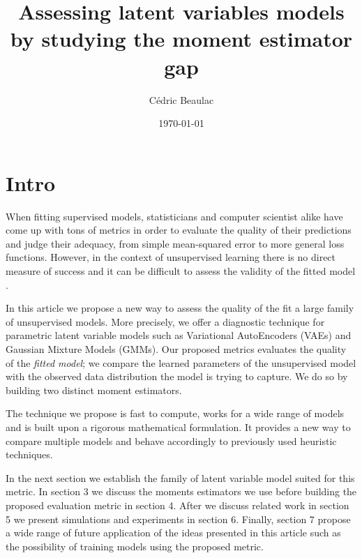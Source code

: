 \documentclass{article}
\begin{document}
\title{Assessing latent variables models by studying the moment estimator gap}



\author{C\'edric Beaulac}


\date{\today}

\maketitle


\section{Intro}

When fitting supervised models, statisticians and computer scientist alike have come up with tons of metrics in order to evaluate the quality of their predictions and judge their adequacy, from simple mean-squared error to more general loss functions. However, in the context of unsupervised learning there is no direct measure of success and it can be difficult to assess the validity of the fitted model \cite{Hastie09}.

\bigskip

In this article we propose a new way to assess the quality of the fit a large family of unsupervised models. More precisely, we offer a diagnostic technique for parametric latent variable models such as Variational AutoEncoders (VAEs) \cite{Kingma13,Kingma17} and Gaussian Mixture Models (GMMs). Our proposed metrics evaluates the quality of the \textit{fitted model}; we compare the learned parameters of the unsupervised model with the observed data distribution the model is trying to capture. We do so by building two distinct moment estimators. 

\bigskip

The technique we propose is fast to compute, works for a wide range of models and is built upon a rigorous mathematical formulation. It provides a new way to compare multiple models and behave accordingly to previously used heuristic techniques.

\bigskip

In the next section we establish the family of latent variable model suited for this metric. In section 3 we discuss the moments estimators we use before building the proposed evaluation metric in section 4. After we discuss related work in section 5 we present simulations and experiments in section 6. Finally, section 7 propose a wide range of future application of the ideas presented in this article such as the possibility of training models using the proposed metric. 
\end{document}
